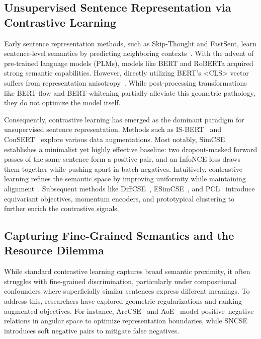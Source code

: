 \documentclass[lettersize,journal]{IEEEtran}
\begin{document}
\subsection{Unsupervised Sentence Representation via Contrastive Learning}

Early sentence representation methods, such as Skip-Thought and FastSent, learn sentence-level semantics by predicting neighboring contexts~\cite{nguyen2026embedtrace}. With the advent of pre-trained language models (PLMs), models like BERT and RoBERTa acquired strong semantic capabilities. However, directly utilizing BERT's <CLS> vector suffers from representation anisotropy~\cite{kurz2026tacl}. While post-processing transformations like BERT-flow and BERT-whitening partially alleviate this geometric pathology, they do not optimize the model itself.

Consequently, contrastive learning has emerged as the dominant paradigm for unsupervised sentence representation. Methods such as IS-BERT~\cite{isbert} and ConSERT~\cite{consert} explore various data augmentations. Most notably, SimCSE~\cite{simcse} establishes a minimalist yet highly effective baseline: two dropout-masked forward passes of the same sentence form a positive pair, and an InfoNCE loss draws them together while pushing apart in-batch negatives. Intuitively, contrastive learning refines the semantic space by improving uniformity while maintaining alignment~\cite{alignment}. Subsequent methods like DiffCSE~\cite{diffcse}, ESimCSE~\cite{esimcse}, and PCL~\cite{pcl} introduce equivariant objectives, momentum encoders, and prototypical clustering to further enrich the contrastive signals.

\subsection{Capturing Fine-Grained Semantics and the Resource Dilemma}

While standard contrastive learning captures broad semantic proximity, it often struggles with fine-grained discrimination, particularly under compositional confounders where superficially similar sentences express different meanings. To address this, researchers have explored geometric regularizations and ranking-augmented objectives. For instance, ArcCSE~\cite{arccse} and AoE~\cite{angle} model positive--negative relations in angular space to optimize representation boundaries, while SNCSE~\cite{sncse} introduces soft negative pairs to mitigate false negatives.
\end{document}
